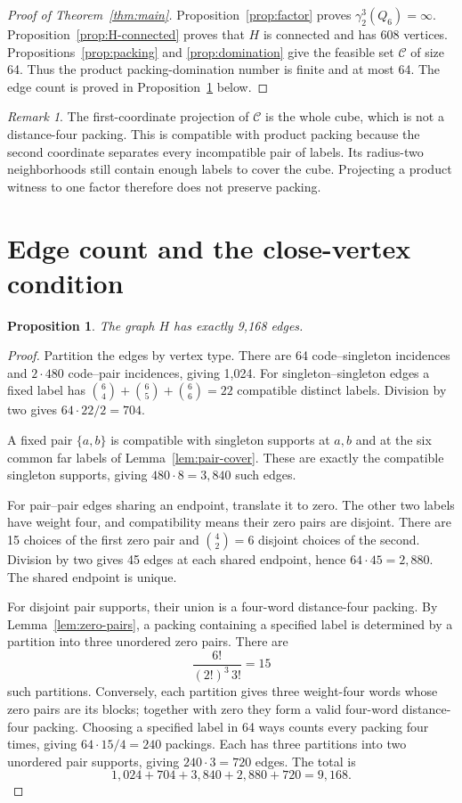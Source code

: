\documentclass[11pt]{article}
\newtheorem{proposition}[theorem]{Proposition}
\theoremstyle{definition}
\theoremstyle{remark}
\newtheorem{remark}[theorem]{Remark}
\newcommand{\code}{\mathcal C}
\begin{document}
\begin{proof}[Proof of Theorem~\ref{thm:main}]
Proposition~\ref{prop:factor} proves \(\gamma_2^3(Q_6)=\infty\).
Proposition~\ref{prop:H-connected} proves that \(H\) is connected
and has 608 vertices. Propositions~\ref{prop:packing} and
\ref{prop:domination} give the feasible set \(\code\) of size 64.
Thus the product packing-domination number is finite and at most 64.
The edge count is proved in Proposition~\ref{prop:edge-count} below.
\end{proof}

\begin{remark}\label{rem:projection}
The first-coordinate projection of \(\code\) is the whole cube,
which is not a distance-four packing. This is compatible with
product packing because the second coordinate separates every
incompatible pair of labels. Its radius-two neighborhoods still
contain enough labels to cover the cube. Projecting a product
witness to one factor therefore does not preserve packing.
\end{remark}

\section{Edge count and the close-vertex condition}\label{sec:additional}
\begin{proposition}\label{prop:edge-count}
The graph \(H\) has exactly 9,168 edges.
\end{proposition}
\begin{proof}
Partition the edges by vertex type. There are 64 code--singleton
incidences and \(2\cdot480\) code--pair incidences, giving 1,024.
For singleton--singleton edges a fixed label has
\(\binom64+\binom65+\binom66=22\) compatible distinct labels.
Division by two gives \(64\cdot22/2=704\).

A fixed pair \(\{a,b\}\) is compatible with singleton supports
at \(a,b\) and at the six common far labels of
Lemma~\ref{lem:pair-cover}. These are exactly the compatible
singleton supports, giving \(480\cdot8=3,840\) such edges.

For pair--pair edges sharing an endpoint, translate it to zero.
The other two labels have weight four, and compatibility means
their zero pairs are disjoint. There are 15 choices of the first
zero pair and \(\binom42=6\) disjoint choices of the second.
Division by two gives 45 edges at each shared endpoint, hence
\(64\cdot45=2,880\). The shared endpoint is unique.

For disjoint pair supports, their union is a four-word
distance-four packing. By Lemma~\ref{lem:zero-pairs}, a packing
containing a specified label is determined by a partition into
three unordered zero pairs. There are
\[
 \frac{6!}{(2!)^3\,3!}=15
\]
such partitions. Conversely, each partition gives three
weight-four words whose zero pairs are its blocks; together
with zero they form a valid four-word distance-four packing.
Choosing a specified label in 64 ways counts
every packing four times, giving \(64\cdot15/4=240\) packings.
Each has three partitions into two unordered pair supports,
giving \(240\cdot3=720\) edges. The total is
\[
 1,024+704+3,840+2,880+720=9,168.
\]
\end{proof}
\end{document}
